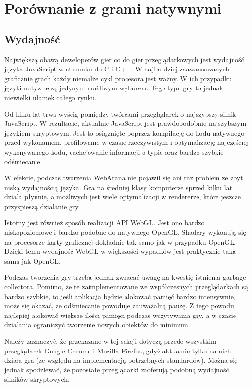 \section{Porównanie z grami natywnymi}
\label{sec:porownanieZNatywnymi}

\subsection{Wydajność}

Największą obawą deweloperów gier co do gier przeglądarkowych jest wydajność języka JavaScript w stosunku
do C i C++. W najbardziej zaawansowanych graficznie grach każdy niemalże cykl procesora jest ważny.
W ich przypadku języki natywne są jedynym możliwym wyborem. Tego typu gry to jednak niewielki ułamek
całego rynku.

Od kilku lat trwa wyścig pomiędzy twórcami przeglądarek o najszybszy silnik JavaScript. W rezultacie,
aktualnie JavaScript jest prawdopodobnie najszybszym językiem skryptowym. Jest to osiągnięte poprzez
kompilację do kodu natywnego przed wykonaniem, profilowanie w czasie rzeczywistym i optymalizację
najczęściej wykonywanego kodu, cache'owanie informacji o typie oraz bardzo szybkie odśmiecanie.

W efekcie, podczas tworzenia WebArana nie pojawił się ani raz problem ze zbyt niską wydajnością języka.
Gra na średniej klasy komputerze sprzed kilku lat działa płynnie, a możliwych jest 
wiele optymalizacji w rendererze, które jeszcze przyspieszą działanie gry. 

Istotny jest również sposób realizacji API WebGL. Jest ono bardzo niskopoziomowe i bardzo podobne
do natywnego OpenGL. Shadery wykonują się na procesorze karty graficznej dokładnie tak samo jak
w przypadku OpenGL. Dzięki temu wydajność WebGL w większości wypadków jest praktycznie taka sama jak
OpenGL.

Podczas tworzenia gry trzeba jednak zwracać uwagę na kwestię istnienia garbage collectora. Pomimo,
że te zaimplementowane we współczesnych przeglądarkach są bardzo szybkie, to jeśli aplikacja
będzie alokować pamięć bardzo intensywnie, może się okazać, że odśmiecanie powoduje zauważalną pauzę.
Z tego powodu najlepiej alokować większe ilości pamięci podczas wczytywania gry, a w czasie działania
ograniczyć tworzenie nowych obiektów do minimum.

Należy zaznaczyć, że przekazane w tej sekcji dotyczą przede wszystkim
przeglądarek Google Chrome i Mozilla Firefox, gdyż
aktualnie tylko na nich działa gra (ze względu na implementacją potrzebnych standardów). Można się jednak
spodziewać, że pozostałe przeglądarki zaoferują podobną wydajność silników skryptowych.

